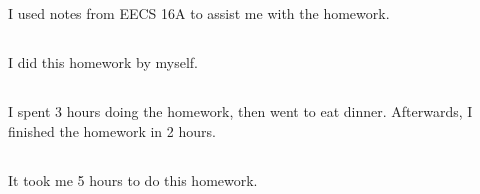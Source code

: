 \documentclass[]{article}
\begin{document}
I used notes from EECS 16A to assist me with the homework.

\subsection{}

I did this homework by myself.

\subsection{}

I spent 3 hours doing the homework, then went to eat dinner.
Afterwards, I finished the homework in 2 hours.

\subsection{}

It took me 5 hours to do this homework.

\newpage

%
\end{document}
